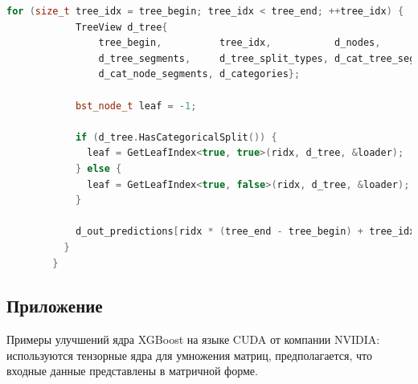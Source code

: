 \documentclass[14pt, a4paper]{extreport}
\begin{document}
\begin{lstlisting}[language=C++, label={lst:xgboost_shared_memory_calculation}]
          for (size_t tree_idx = tree_begin; tree_idx < tree_end; ++tree_idx) {
            TreeView d_tree{
                tree_begin,          tree_idx,           d_nodes,
                d_tree_segments,     d_tree_split_types, d_cat_tree_segments,
                d_cat_node_segments, d_categories};

            bst_node_t leaf = -1;

            if (d_tree.HasCategoricalSplit()) {
              leaf = GetLeafIndex<true, true>(ridx, d_tree, &loader);
            } else {
              leaf = GetLeafIndex<true, false>(ridx, d_tree, &loader);
            }

            d_out_predictions[ridx * (tree_end - tree_begin) + tree_idx] = __float2half_rn(leaf);
          }
        }
    \end{lstlisting}

    \subsection{Приложение } \label{subsec:xgboost_cuda_tensor_upgrade}
    Примеры улучшений ядра XGBoost на языке CUDA от компании NVIDIA: используются тензорные ядра для умножения матриц, предполагается, что входные данные представлены в матричной форме.
\end{document}
